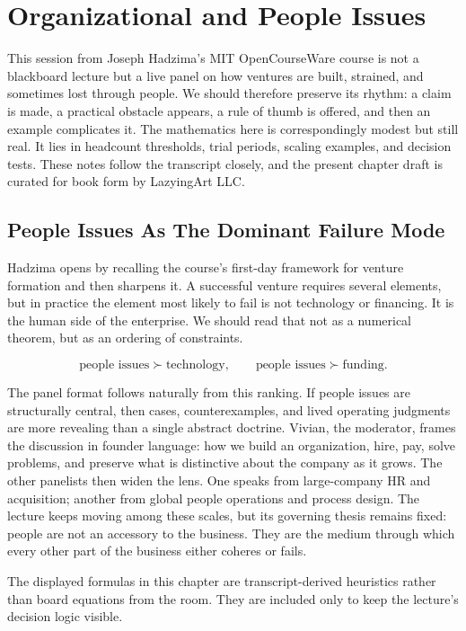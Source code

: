 \chapter{Organizational and People Issues}

This session from Joseph Hadzima's MIT OpenCourseWare course is not a blackboard lecture but a live panel on how ventures are built, strained, and sometimes lost through people. We should therefore preserve its rhythm: a claim is made, a practical obstacle appears, a rule of thumb is offered, and then an example complicates it. The mathematics here is correspondingly modest but still real. It lies in headcount thresholds, trial periods, scaling examples, and decision tests. These notes follow the transcript closely, and the present chapter draft is curated for book form by LazyingArt LLC.

\section{People Issues As The Dominant Failure Mode}

Hadzima opens by recalling the course's first-day framework for venture formation and then sharpens it. A successful venture requires several elements, but in practice the element most likely to fail is not technology or financing. It is the human side of the enterprise. We should read that not as a numerical theorem, but as an ordering of constraints.

\begin{equation}
\text{people issues} \succ \text{technology},
\qquad
\text{people issues} \succ \text{funding}.
\end{equation}

The panel format follows naturally from this ranking. If people issues are structurally central, then cases, counterexamples, and lived operating judgments are more revealing than a single abstract doctrine. Vivian, the moderator, frames the discussion in founder language: how we build an organization, hire, pay, solve problems, and preserve what is distinctive about the company as it grows. The other panelists then widen the lens. One speaks from large-company HR and acquisition; another from global people operations and process design. The lecture keeps moving among these scales, but its governing thesis remains fixed: people are not an accessory to the business. They are the medium through which every other part of the business either coheres or fails.

\begin{remark}
The displayed formulas in this chapter are transcript-derived heuristics rather than board equations from the room. They are included only to keep the lecture's decision logic visible.
\end{remark}

